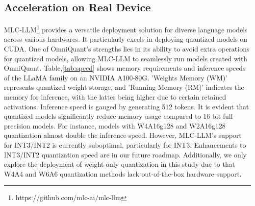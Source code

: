 \documentclass{article} %
\begin{document}
\subsection{Acceleration on Real Device}\label{sec:deployment}


MLC-LLM\footnote{https://github.com/mlc-ai/mlc-llm} provides a versatile deployment solution for diverse language models across various hardwares. It particularly excels in deploying quantized models on CUDA.
%
One of OmniQuant's strengths lies in its ability to avoid extra operations for quantized models, allowing MLC-LLM to seamlessly run models created with OmniQuant.
%
Table,\ref{tab:speed} shows memory requirements and inference speeds of the LLaMA family on an NVIDIA A100-80G. 'Weights Memory (WM)' represents quantized weight storage, and 'Running Memory (RM)' indicates the memory for inference, with the latter being higher due to certain retained activations. Inference speed is gauged by generating 512 tokens.
%
It is evident that quantized models significantly reduce memory usage compared to 16-bit full-precision models. For instance, models with W4A16g128 and W2A16g128 quantization almost double the inference speed. However, MLC-LLM's support for INT3/INT2 is currently suboptimal, particularly for INT3. Enhancements to INT3/INT2 quantization speed are in our future roadmap.
%
Additionally, we only explore the deployment of weight-only quantization in this study due to that W4A4 and W6A6 quantization methods lack out-of-the-box hardware support.
\end{document}
